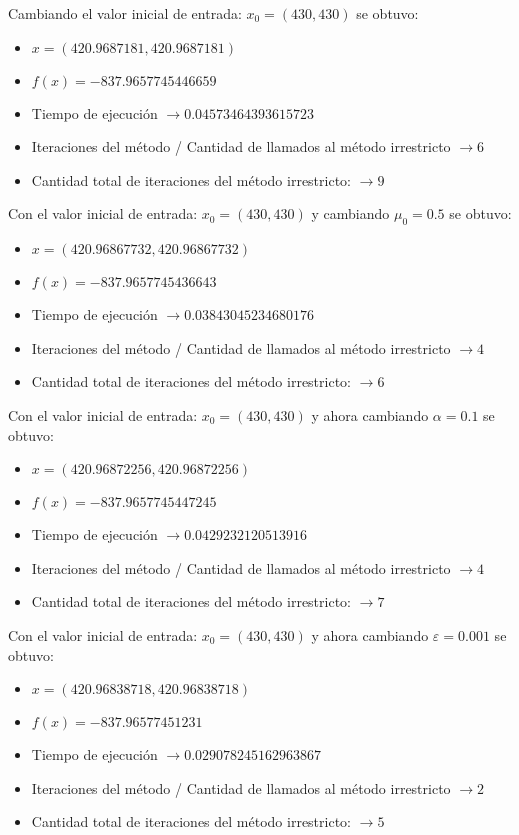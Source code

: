 \documentclass[titlepage, 11pt]{scrartcl}
\begin{document}
	Cambiando el valor inicial de entrada: $x_0 = (430, 430)$ se obtuvo:
	\begin{itemize}
		\item $x = (420.9687181, 420.9687181)$
		\item $f(x) = -837.9657745446659$
		\item Tiempo de ejecución $\rightarrow 0.04573464393615723$
		\item Iteraciones del método / Cantidad de llamados al método irrestricto $\rightarrow 6$
		\item Cantidad total de iteraciones del método irrestricto: $\rightarrow 9$
	\end{itemize}
	Con el valor inicial de entrada: $x_0 = (430, 430)$ y cambiando $\mu_0 = 0.5$ se obtuvo:
	\begin{itemize}
		\item $x = (420.96867732, 420.96867732)$
		\item $f(x) = -837.9657745436643$
		\item Tiempo de ejecución $\rightarrow 0.03843045234680176$
		\item Iteraciones del método / Cantidad de llamados al método irrestricto $\rightarrow 4$
		\item Cantidad total de iteraciones del método irrestricto: $\rightarrow 6$
	\end{itemize}
	Con el valor inicial de entrada: $x_0 = (430, 430)$ y ahora cambiando $\alpha = 0.1$ se obtuvo:
	\begin{itemize}
		\item $x = (420.96872256, 420.96872256)$
		\item $f(x) = -837.9657745447245$
		\item Tiempo de ejecución $\rightarrow 0.0429232120513916$
		\item Iteraciones del método / Cantidad de llamados al método irrestricto $\rightarrow 4$
		\item Cantidad total de iteraciones del método irrestricto: $\rightarrow 7$
	\end{itemize}
	Con el valor inicial de entrada: $x_0 = (430, 430)$ y ahora cambiando $\varepsilon = 0.001$ se obtuvo:
	\begin{itemize}
		\item $x = (420.96838718, 420.96838718)$
		\item $f(x) = -837.96577451231$
		\item Tiempo de ejecución $\rightarrow 0.029078245162963867$
		\item Iteraciones del método / Cantidad de llamados al método irrestricto $\rightarrow 2$
		\item Cantidad total de iteraciones del método irrestricto: $\rightarrow 5$
	\end{itemize}
\end{document}
